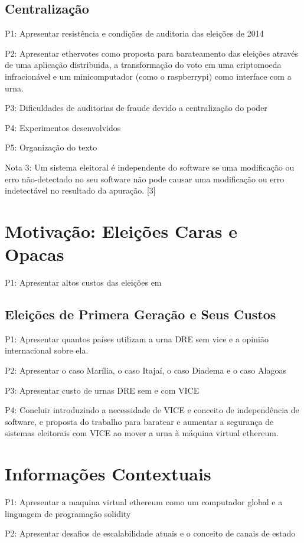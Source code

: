 \documentclass[
	article,			%
	11pt,				%
	oneside,			%
	a4paper,			%
	english,			%
	brazil,				%
	sumario=tradicional
	]{abntex2}
\begin{document}
\subsection{Centralização}

 P1: Apresentar resistência e condições de auditoria das eleições de 2014
 
 P2: Apresentar ethervotes como proposta para barateamento das eleições através de uma aplicação distribuida, a transformação do voto em uma criptomoeda infracionável e um minicomputador (como o raspberrypi) como interface com a urna.
 
 P3: Dificuldades de auditorias de fraude devido a centralização do poder
 
 P4: Experimentos desenvolvidos
 
 P5: Organização do texto
 
 Nota 3: Um sistema eleitoral é independente do software se uma modificação ou erro não-detectado no seu software não pode causar uma modificação ou erro indetectável no resultado da apuração. [3]

\section{Motivação: Eleições Caras e Opacas}
P1: Apresentar altos custos das eleições em 
\subsection{Eleições de Primera Geração e Seus Custos}
P1: Apresentar quantos países utilizam a urna DRE sem vice e a opinião internacional sobre ela.

P2: Apresentar o caso Marília, o caso Itajaí, o caso Diadema e o caso Alagoas

P3: Apresentar custo de urnas DRE sem e com VICE

P4: Concluir introduzindo a necessidade de VICE e conceito de independência de software, e proposta do trabalho para baratear e aumentar a segurança de sistemas  eleitorais com VICE ao mover a urna à máquina virtual ethereum.

\section{Informações Contextuais}
 P1: Apresentar a maquina virtual ethereum como um computador global e a linguagem de programação solidity
 
 P2: Apresentar desafios de escalabilidade atuais e o conceito de canais de estado
 
\end{document}
